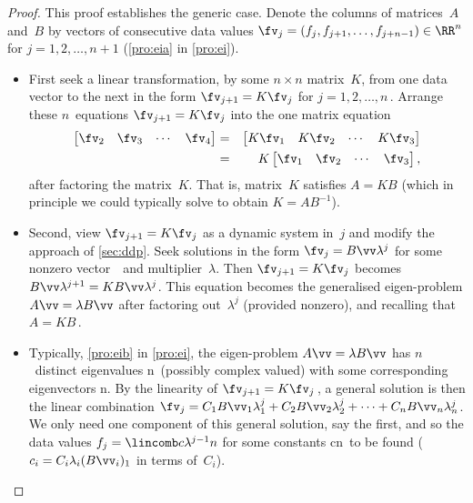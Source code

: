 \begin{proof} 
This proof establishes the generic case.
Denote the columns of matrices~\(A\) and~\(B\) by vectors of consecutive data values \(\fv_j=(f_j, f_{j+1},\ldots,f_{j+n-1})\in\RR^n\) for \(j=1,2,\ldots,n+1\) (\autoref{pro:eia} in \autoref{pro:ei}).
\begin{itemize}
\item First seek a linear transformation, by some \(n\times n\) matrix~\(K\), from one data vector to the next in the form \(\fv_{j+1}=K\fv_j\) for \(j=1,2,\ldots,n\)\,.
Arrange these \(n\)~equations \(\fv_{j+1}=K\fv_j\) into the one matrix equation
\begin{eqnarray*}
\begin{bmatrix} \fv_2&\fv_3&\cdots&\fv_4 \end{bmatrix}
&=&\begin{bmatrix} K\fv_1&K\fv_2&\cdots&K\fv_3 \end{bmatrix}
\\&=&K\begin{bmatrix} \fv_1&\fv_2&\cdots&\fv_3 \end{bmatrix},
\end{eqnarray*}
after factoring the matrix~\(K\).
That is, matrix~\(K\) satisfies \(A=KB\) (which in principle we could typically solve to obtain \(K=AB^{-1}\)).

\item Second, view \(\fv_{j+1}=K\fv_j\) as a dynamic system in~\(j\) and modify the approach of \autoref{sec:ddp}.
Seek solutions in the form \(\fv_j=B\vv \lambda^j\) for some nonzero vector~\vv\ and multiplier~\(\lambda\).
Then \(\fv_{j+1}=K\fv_j\) becomes \(B\vv \lambda^{j+1}=KB\vv \lambda^j\).
This equation becomes the generalised eigen-problem \(A\vv=\lambda B\vv\) after factoring out~\(\lambda^j\) (provided nonzero), and recalling that \(A=KB\)\,.

\item Typically, \autoref{pro:eib} in \autoref{pro:ei}, the eigen-problem \(A\vv=\lambda B\vv\) has \(n\)~distinct eigenvalues \hlist\lambda n\ (possibly complex valued) with some corresponding eigenvectors \hlist\vv n.
By the linearity of \(\fv_{j+1}=K\fv_j\)\,, a general solution is then the linear combination \(\fv_j=C_1B\vv_1\lambda_1^{j} +C_2B\vv_2\lambda_2^{j} +\cdots +C_nB\vv_n\lambda_n^{j}\).
We only need one component of this general solution, say the first, and so the data values \(f_j=\lincomb c{\lambda^{j-1}}n\) for some constants \hlist cn\ to be found (\(c_i=C_i\lambda_i(B\vv_i)_1\) in terms of~\(C_i\)).


\end{itemize}
\end{proof}
